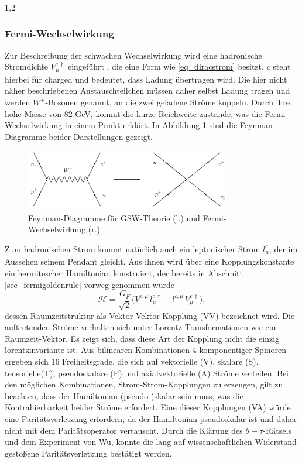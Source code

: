 \documentclass[11pt,a4paper,twoside,draft]{report}
\begin{document}
\begin{spacing}{1,2}
\subsubsection{Fermi-Wechselwirkung}
\label{sec_fermiWW}
Zur Beschreibung der schwachen Wechselwirkung wird eine hadronische Stromdichte $V_\mu^{c\,\dagger}$ eingeführt \cite{Klapdor}, die eine Form wie 
\eqref{eq_diracstrom} besitzt. 
$c$ steht hierbei für charged und bedeutet, dass Ladung
übertragen wird. Die hier nicht näher beschriebenen Austauschteilchen müssen daher selbst Ladung tragen und werden $W^\pm$-Bosonen genannt, an die zwei 
geladene Ströme koppeln. Durch ihre hohe Masse von 82 GeV, kommt die kurze Reichweite zustande, was die Fermi-Wechselwirkung in einem Punkt erklärt. In
Abbildung \ref{pic_4fermi} sind die Feynman-Diagramme beider Darstellungen gezeigt.
\begin{figure}[H]
\includegraphics[width=0.8\textwidth]{Abbildungen/4fermi.jpg}
\caption{Feynman-Diagramme für GSW-Theorie (l.) und Fermi-Wechselwirkung (r.)}
\label{pic_4fermi}
\end{figure}
Zum hadronischen Strom kommt natürlich auch ein leptonischer Strom $l_\mu^c$, der im Aussehen seinem Pendant gleicht. Aus ihnen wird über eine Kopplungskonstante
ein hermitescher Hamiltonian konstruiert, der bereits in Abschnitt \ref{sec_fermigoldenrule} vorweg genommen wurde
\begin{equation}
 \mathcal{H} = \frac{G_F}{\sqrt{2}}\big(V^{c,\mu}\,l_\mu^{c\,\dagger} + l^{c,\mu}\,V_\mu^{c\,\dagger}\big),
\end{equation}
dessen Raumzeitstruktur als Vektor-Vektor-Kopplung (VV) bezeichnet wird. Die auftretenden Ströme verhalten sich unter Lorentz-Transformationen wie ein Raumzeit-Vektor.
Es zeigt sich, dass diese Art der Kopplung nicht die einzig lorentzinvariante ist. Aus bilinearen Kombinationen 4-komponentiger Spinoren ergeben sich 16 Freiheitsgrade,
die sich auf vektorielle (V), skalare (S), tensorielle(T), pseudoskalare (P) und axialvektorielle (A) Ströme verteilen. Bei den möglichen Kombinationen, Strom-Strom-Kopplungen zu erzeugen, gilt zu beachten, dass
der Hamiltonian (pseudo-)skalar sein muss, was die Kontrahierbarkeit beider Ströme erfordert. Eine dieser Kopplungen (VA) würde eine Paritätsverletzung erfordern,
da der Hamiltonian pseudoskalar ist und daher nicht mit dem Paritätsoperator vertauscht. Durch die Klärung des $\theta-\tau$-Rätsels und dem Experiment von Wu,
konnte die lang auf wissenschaftlichen Widerstand gestoßene Paritätsverletzung bestätigt werden.


\end{spacing}
\end{document}
